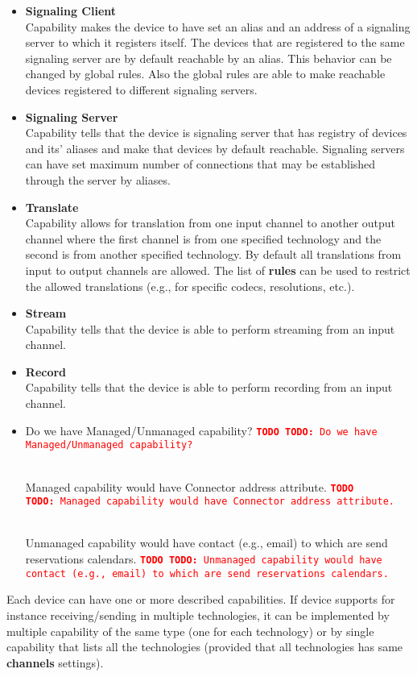 \documentclass[a4paper]{report}
\newcommand{\TODO}[1]{%
\def\empty{}%
\def\prvniparametr{#1}%
\ifx\prvniparametr\empty%
\begingroup\tt\textcolor{red}{\noindent\textbf{TODO}}\endgroup
\else%
\begingroup\tt\textcolor{red}{\noindent\textbf{TODO:}\ #1}\endgroup
\fi%
}
\begin{document}
\begin{itemize}
\item \textbf{Signaling Client} \\
  Capability makes the device to have set an alias 
  and an address of a signaling server to which it registers itself.
  The devices that are registered to the same signaling server are by
  default reachable by an alias. This behavior can be changed by global rules. 
  Also the global rules are able to make reachable devices registered to 
  different signaling servers.

\item \textbf{Signaling Server} \\
  Capability tells that the device is signaling server
  that has registry of devices and its' aliases and make that devices by 
  default reachable. Signaling servers can have set maximum number of 
  connections that may be established through the server by aliases.

\item \textbf{Translate}  \\
  Capability allows for translation from one input channel to another output 
  channel where the first channel is from one specified technology and the 
  second is from another specified technology. By default all translations from 
  input to output channels are allowed. The list of \textbf{rules} can be used 
  to restrict the allowed translations (e.g., for specific codecs, resolutions, etc.).

\item \textbf{Stream}  \\
  Capability tells that the device is able to perform streaming from an input 
  channel.

\item \textbf{Record}  \\
  Capability tells that the device is able to perform recording from an input 
  channel.
  
\item \TODO{Do we have Managed/Unmanaged capability?}
 \\ \TODO{Managed capability would have Connector address attribute.}
 \\ \TODO{Unmanaged capability would have contact (e.g., email) to which
 are send reservations calendars.}
\end{itemize}

Each device can have one or more described capabilities. If device supports 
for instance receiving/sending in multiple technologies, it can be implemented 
by multiple capability of the same type (one for each technology) or by single 
capability that lists all the technologies (provided that all technologies has same \textbf{channels} settings).
\end{document}
